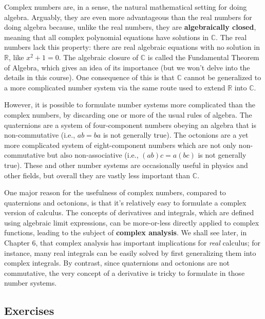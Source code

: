 \documentclass[10pt,a4paper]{article}
\begin{document}
Complex numbers are, in a sense, the natural mathematical setting for
doing algebra. Arguably, they are even more advantageous than the real
numbers for doing algebra because, unlike the real numbers, they are
\textbf{algebraically closed}, meaning that all complex polynomial
equations have solutions in $\mathbb{C}$. The real numbers lack this
property: there are real algebraic equations with no solution in
$\mathbb{R}$, like $x^2 + 1 = 0$.  The algebraic closure of
$\mathbb{C}$ is called the Fundamental Theorem of Algebra, which gives
an idea of its importance (but we won't delve into the details in this
course). One consequence of this is that $\mathbb{C}$ cannot be
generalized to a more complicated number system via the same route
used to extend $\mathbb{R}$ into $\mathbb{C}$.

However, it is possible to formulate number systems more complicated
than the complex numbers, by discarding one or more of the usual rules
of algebra.  The quaternions are a system of four-component numbers
obeying an algebra that is non-commutative (i.e., $ab = ba$ is not
generally true).  The octonions are a yet more complicated system of
eight-component numbers which are not only non-commutative but also
non-associative (i.e., $(ab)c = a(bc)$ is not generally true).  These
and other number systems are occasionally useful in physics and other
fields, but overall they are vastly less important than $\mathbb{C}$.

One major reason for the usefulness of complex numbers, compared to
quaternions and octonions, is that it's relatively easy to formulate a
complex version of calculus. The concepts of derivatives and
integrals, which are defined using algebraic limit expressions, can be
more-or-less directly applied to complex functions, leading to the
subject of \textbf{complex analysis}.  We shall see later, in Chapter
6, that complex analysis has important implications for \textit{real}
calculus; for instance, many real integrals can be easily solved by
first generalizing them into complex integrals.  By contrast, since
quaternions and octonions are not commutative, the very concept of a
derivative is tricky to formulate in those number systems.

\subsection{Exercises}
\end{document}
